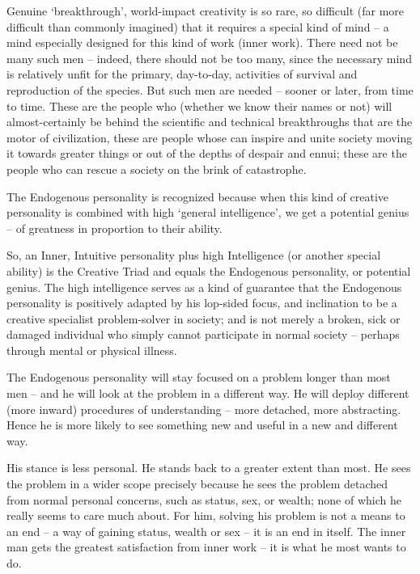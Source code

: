 \documentclass[
]{book}
\begin{document}
Genuine `breakthrough', world-impact creativity is so rare, so difficult (far more difficult than commonly imagined) that it requires a special kind of mind -- a mind especially designed for this kind of work (inner work). There need not be many such men -- indeed, there should not be too many, since the necessary mind is relatively unfit for the primary, day-to-day, activities of survival and reproduction of the species. But such men are needed -- sooner or later, from time to time.
These are the people who (whether we know their names or not) will almost-certainly be behind the scientific and technical breakthroughs that are the motor of civilization, these are people whose can inspire and unite society moving it towards greater things or out of the depths of despair and ennui; these are the people who can rescue a society on the brink of catastrophe.

The Endogenous personality is recognized because when this kind of creative personality is combined with high `general intelligence', we get a potential genius -- of greatness in proportion to their ability.

So, an Inner, Intuitive personality plus high Intelligence (or another special ability) is the Creative Triad and equals the Endogenous personality, or potential genius. The high intelligence serves as a kind of guarantee that the Endogenous personality is positively adapted by his lop-sided focus, and inclination to be a creative specialist problem-solver in society; and is not merely a broken, sick or damaged individual who simply cannot participate in normal society -- perhaps through mental or physical illness.

The Endogenous personality will stay focused on a problem longer than most men -- and he will look at the problem in a different way. He will deploy different (more inward) procedures of understanding -- more detached, more abstracting. Hence he is more likely to see something new and useful in a new and different way.

His stance is less personal. He stands back to a greater extent than most. He sees the problem in a wider scope precisely because he sees the problem detached from normal personal concerns, such as status, sex, or wealth; none of which he really seems to care much about. For him, solving his problem is not a means to an end -- a way of gaining status, wealth or sex -- it is an end in itself. The inner man gets the greatest satisfaction from inner work -- it is what he most wants to do.
\end{document}
